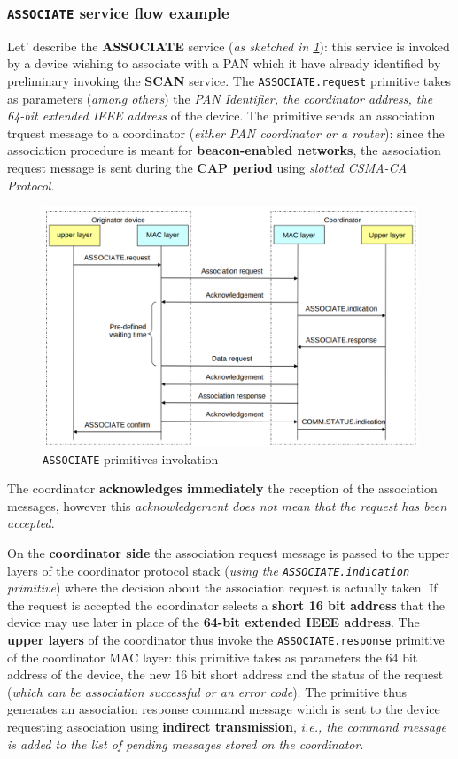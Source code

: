 \documentclass[10pt,a4paper]{report}
\theoremstyle{definition}
\begin{document}
\subsubsection{\texttt{ASSOCIATE} service flow example}
Let' describe the \textbf{ASSOCIATE} service (\textit{as sketched in \ref{associate-primitive-example}}): this service is invoked by a device wishing to associate with a PAN which it have already identified by preliminary invoking the \textbf{SCAN} service. The \texttt{ASSOCIATE.request} primitive takes as parameters (\textit{among others}) the \textit{PAN Identifier, the coordinator address, the 64-bit extended IEEE address} of the device.
The primitive sends an association trquest message to a coordinator (\textit{either PAN coordinator or a router}): since the association procedure is meant for \textbf{beacon-enabled networks}, the association request message is sent during the \textbf{CAP period} using \textit{slotted CSMA-CA Protocol}.
\begin{figure}[h]
	\centering\includegraphics[scale=0.30]{images/Pasted image 20230417092900.png}
	\caption{\texttt{ASSOCIATE} primitives invokation}
	\label{associate-primitive-example}
\end{figure}

The coordinator \textbf{acknowledges immediately} the reception of the association messages, however this \textit{acknowledgement does not mean that the request has been accepted}.

On the \textbf{coordinator side} the association request message is passed to the upper layers of the coordinator protocol stack (\textit{using the \texttt{ASSOCIATE.indication} primitive}) where the decision about the association request is actually taken.
If the request is accepted the coordinator selects a \textbf{short 16 bit address} that the device may use later in place of the \textbf{64-bit extended IEEE address}.
The \textbf{upper layers} of the coordinator thus invoke the \texttt{ASSOCIATE.response} primitive of the coordinator MAC layer: this primitive takes as parameters the 64 bit address of the device, the new 16 bit short address and the status of the request (\textit{which can be association successful or an error code}). The primitive thus generates an association response command message which is sent to the device requesting association using \textbf{indirect transmission}, \textit{i.e., the command message is added to the list of pending messages stored on the coordinator}.
\end{document}
